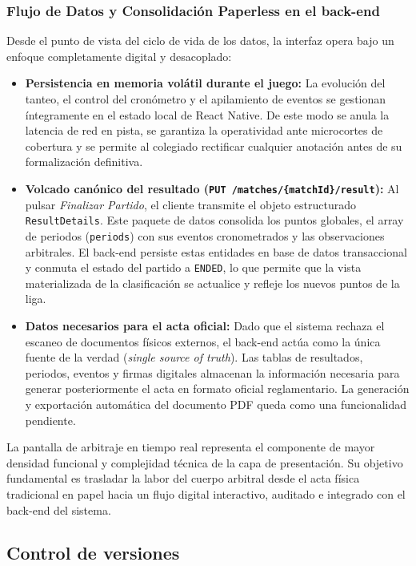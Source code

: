 \subsubsection{Flujo de Datos y Consolidación Paperless en el back-end}
Desde el punto de vista del ciclo de vida de los datos, la interfaz opera bajo un enfoque completamente digital y desacoplado:

\begin{itemize}
    \item \textbf{Persistencia en memoria volátil durante el juego:} La evolución del tanteo, el control del cronómetro y el apilamiento de eventos se gestionan íntegramente en el estado local de React Native. De este modo se anula la latencia de red en pista, se garantiza la operatividad ante microcortes de cobertura y se permite al colegiado rectificar cualquier anotación antes de su formalización definitiva.
    \item \textbf{Volcado canónico del resultado (\texttt{PUT /matches/\{matchId\}/result}):} Al pulsar \textit{Finalizar Partido}, el cliente transmite el objeto estructurado \texttt{ResultDetails}. Este paquete de datos consolida los puntos globales, el array de periodos (\texttt{periods}) con sus eventos cronometrados y las observaciones arbitrales. El back-end persiste estas entidades en base de datos transaccional y conmuta el estado del partido a \texttt{ENDED}, lo que permite que la vista materializada de la clasificación se actualice y refleje los nuevos puntos de la liga.
    \item \textbf{Datos necesarios para el acta oficial:} Dado que el sistema rechaza el escaneo de documentos físicos externos, el back-end actúa como la única fuente de la verdad (\textit{single source of truth}). Las tablas de resultados, periodos, eventos y firmas digitales almacenan la información necesaria para generar posteriormente el acta en formato oficial reglamentario. La generación y exportación automática del documento PDF queda como una funcionalidad pendiente.
\end{itemize}

La pantalla de arbitraje en tiempo real representa el componente de mayor densidad funcional y complejidad técnica de la capa de presentación. Su objetivo fundamental es trasladar la labor del cuerpo arbitral desde el acta física tradicional en papel hacia un flujo digital interactivo, auditado e integrado con el back-end del sistema.

\subsection{Control de versiones}

